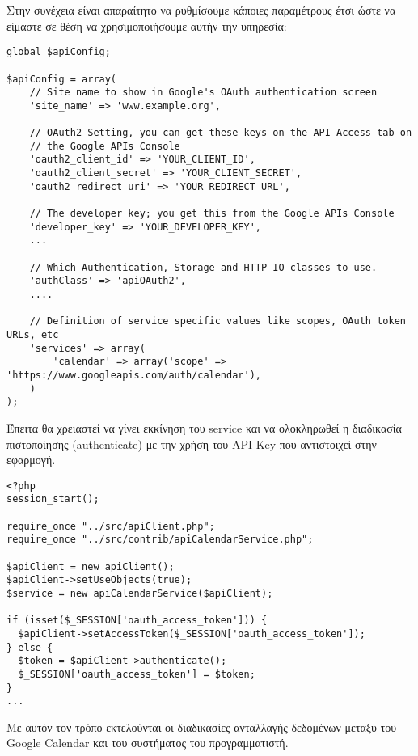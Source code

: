 \documentclass[12pt]{article}
\begin{document}
Στην συνέχεια είναι απαραίτητο να ρυθμίσουμε κάποιες παραμέτρους έτσι ώστε να είμαστε σε θέση να χρησιμοποιήσουμε αυτήν την υπηρεσία:

\begin{verbatim}
global $apiConfig;

$apiConfig = array(
    // Site name to show in Google's OAuth authentication screen
    'site_name' => 'www.example.org',

    // OAuth2 Setting, you can get these keys on the API Access tab on
    // the Google APIs Console
    'oauth2_client_id' => 'YOUR_CLIENT_ID',
    'oauth2_client_secret' => 'YOUR_CLIENT_SECRET',
    'oauth2_redirect_uri' => 'YOUR_REDIRECT_URL',

    // The developer key; you get this from the Google APIs Console
    'developer_key' => 'YOUR_DEVELOPER_KEY',
    ...

    // Which Authentication, Storage and HTTP IO classes to use.
    'authClass' => 'apiOAuth2',
    ....

    // Definition of service specific values like scopes, OAuth token URLs, etc
    'services' => array(
        'calendar' => array('scope' => 'https://www.googleapis.com/auth/calendar'),
    )
);
\end{verbatim}

Έπειτα θα χρειαστεί να γίνει εκκίνηση του service και να ολοκληρωθεί η διαδικασία πιστοποίησης (authenticate) με την χρήση του API Key που αντιστοιχεί στην εφαρμογή.

\begin{verbatim}
<?php
session_start();

require_once "../src/apiClient.php";
require_once "../src/contrib/apiCalendarService.php";

$apiClient = new apiClient();
$apiClient->setUseObjects(true);
$service = new apiCalendarService($apiClient);

if (isset($_SESSION['oauth_access_token'])) {
  $apiClient->setAccessToken($_SESSION['oauth_access_token']);
} else {
  $token = $apiClient->authenticate();
  $_SESSION['oauth_access_token'] = $token;
}
...
\end{verbatim}

Με αυτόν τον τρόπο εκτελούνται οι διαδικασίες ανταλλαγής δεδομένων μεταξύ του Google Calendar και του συστήματος του προγραμματιστή.
\end{document}
